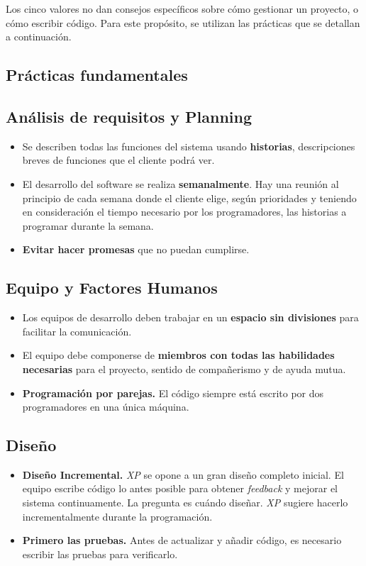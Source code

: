 Los cinco valores no dan consejos específicos sobre cómo gestionar un proyecto, o cómo 
escribir código. Para este propósito, se utilizan las prácticas que se detallan a continuación.

\subsection{Prácticas fundamentales}
\subsection{Análisis de requisitos y Planning}
\begin{itemize}
\item Se describen todas las funciones del sistema usando \textbf{historias}, descripciones breves de funciones que el cliente podrá ver.
\item El desarrollo del software se realiza \textbf{semanalmente}. Hay una reunión al principio de cada semana donde el cliente elige, según prioridades y teniendo en consideración el tiempo necesario por los programadores, las historias a programar durante la semana.
\item \textbf{Evitar hacer promesas} que no puedan cumplirse. 
\end{itemize}

\subsection{Equipo y Factores Humanos}
\begin{itemize}
\item Los equipos de desarrollo deben trabajar en un \textbf{espacio sin divisiones} para facilitar la comunicación.
\item El equipo debe componerse de \textbf{miembros con todas las habilidades necesarias} para el proyecto, sentido de compañerismo y de ayuda mutua. 
\item \textbf{Programación por parejas.} El código siempre está escrito por dos programadores en una única máquina.
\end{itemize}

\subsection{Diseño}
\begin{itemize}
\item \textbf{Diseño Incremental.} \textit{XP} se opone a un gran diseño completo inicial. El equipo escribe código lo antes posible para obtener \textit{feedback} y mejorar el sistema continuamente. La pregunta es cuándo diseñar. \textit{XP} sugiere hacerlo incrementalmente durante la programación.
\item \textbf{Primero las pruebas.} Antes de actualizar y añadir código, es necesario escribir las pruebas para verificarlo. 
\end{itemize}
